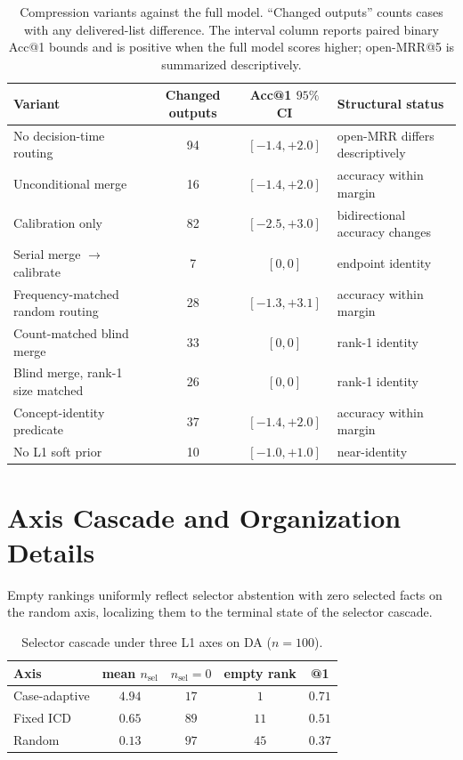 \documentclass[letterpaper]{article}
\begin{document}
\begin{table}[t]
\centering
\small
\begin{tabular}{lccl}
\toprule
Variant & Changed outputs & Acc@1 $95\%$ CI & Structural status \\
\midrule
No decision-time routing & 94 & $[-1.4,+2.0]$ & open-MRR differs descriptively \\
Unconditional merge & 16 & $[-1.4,+2.0]$ & accuracy within margin \\
Calibration only & 82 & $[-2.5,+3.0]$ & bidirectional accuracy changes \\
Serial merge $\rightarrow$ calibrate & 7 & $[0,0]$ & endpoint identity \\
Frequency-matched random routing & 28 & $[-1.3,+3.1]$ & accuracy within margin \\
Count-matched blind merge & 33 & $[0,0]$ & rank-1 identity \\
Blind merge, rank-1 size matched & 26 & $[0,0]$ & rank-1 identity \\
Concept-identity predicate & 37 & $[-1.4,+2.0]$ & accuracy within margin \\
No L1 soft prior & 10 & $[-1.0,+1.0]$ & near-identity \\
\bottomrule
\end{tabular}
\caption{Compression variants against the full model. ``Changed outputs'' counts cases with any delivered-list difference. The interval column reports paired binary Acc@1 bounds and is positive when the full model scores higher; open-MRR@5 is summarized descriptively.}
\label{tab:eq-equiv}
\end{table}

\section{Axis Cascade and Organization Details}

Empty rankings uniformly reflect selector abstention with zero selected facts on the random axis, localizing them to the terminal state of the selector cascade.

\begin{table}[tb]
\centering
\small
\begin{tabular}{@{}lcccc@{}}
\toprule
Axis & mean $n_{\mathrm{sel}}$ & $n_{\mathrm{sel}}{=}0$ & empty rank & @1 \\
\midrule
Case-adaptive & $4.94$ & $17$ & $1$ & $0.71$ \\
Fixed ICD & $0.65$ & $89$ & $11$ & $0.51$ \\
Random & $0.13$ & $97$ & $45$ & $0.37$ \\
\bottomrule
\end{tabular}
\caption{Selector cascade under three L1 axes on DA ($n{=}100$).}
\label{tab:org-cascade}
\end{table}
\end{document}
